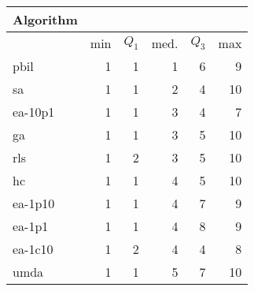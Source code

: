 \begin{tabular}{@{} l *{5}{>{{}}n{2}{0}} @{}}
\toprule
{Algorithm} &  \\
\midrule
& {min} & {$Q_1$} & {med.} & {$Q_3$} & {max} \\
\midrule
pbil & 1 & 1 & 1 & 6 & 9 \\
sa & 1 & 1 & 2 & 4 & 10 \\
ea-10p1 & 1 & 1 & 3 & 4 & 7 \\
ga & 1 & 1 & 3 & 5 & 10 \\
rls & 1 & 2 & 3 & 5 & 10 \\
hc & 1 & 1 & 4 & 5 & 10 \\
ea-1p10 & 1 & 1 & 4 & 7 & 9 \\
ea-1p1 & 1 & 1 & 4 & 8 & 9 \\
ea-1c10 & 1 & 2 & 4 & 4 & 8 \\
umda & 1 & 1 & 5 & 7 & 10 \\
\bottomrule
\end{tabular}
